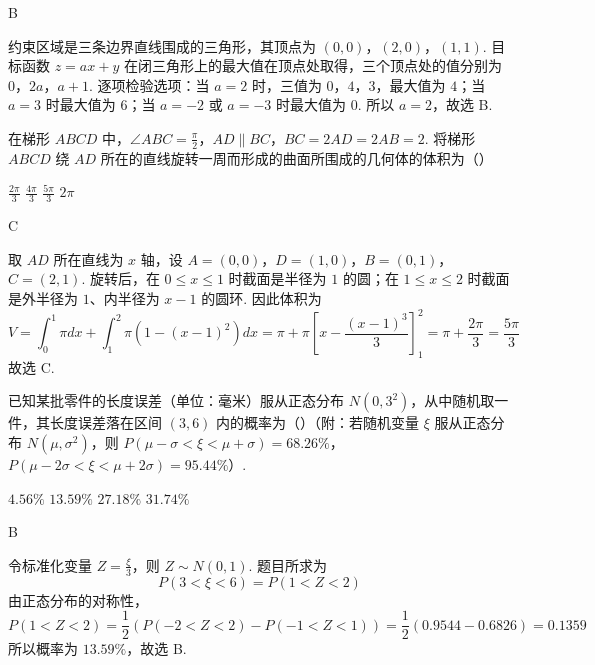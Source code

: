 \begin{answer}
B
\end{answer}

\begin{solution}
约束区域是三条边界直线围成的三角形，其顶点为
\((0,0)\)，\((2,0)\)，\((1,1)\).
目标函数 \(z=ax+y\) 在闭三角形上的最大值在顶点处取得，三个顶点处的值分别为
\(0\)，\(2a\)，\(a+1\).
逐项检验选项：当 \(a=2\) 时，三值为 \(0\)，\(4\)，\(3\)，最大值为 \(4\)；当 \(a=3\) 时最大值为 \(6\)；当 \(a=-2\) 或 \(a=-3\) 时最大值为 \(0\).
所以 \(a=2\)，故选 B.
\end{solution}

\begin{problem}
在梯形 \(ABCD\) 中，\(\angle ABC = \frac{\pi}{2}\)，\(AD \parallel BC\)，\(BC = 2AD = 2AB = 2\). 将梯形 \(ABCD\) 绕 \(AD\) 所在的直线旋转一周而形成的曲面所围成的几何体的体积为（\quad）

\choices
    {\(\frac{2\pi}{3}\)}
    {\(\frac{4\pi}{3}\)}
    {\(\frac{5\pi}{3}\)}
    {\(2\pi\)}
\end{problem}

\begin{answer}
C
\end{answer}

\begin{solution}
取 \(AD\) 所在直线为 \(x\) 轴，设
\(A=(0,0)\)，\(D=(1,0)\)，\(B=(0,1)\)，\(C=(2,1)\).
旋转后，在 \(0\leqslant x\leqslant1\) 时截面是半径为 \(1\) 的圆；在 \(1\leqslant x\leqslant2\) 时截面是外半径为 \(1\)、内半径为 \(x-1\) 的圆环. 因此体积为
\[
V=\int_0^1\pi dx+\int_1^2\pi\left(1-(x-1)^2\right)dx
=\pi+\pi\left[x-\frac{(x-1)^3}{3}\right]_1^2
=\pi+\frac{2\pi}{3}=\frac{5\pi}{3}
\]
故选 C.
\end{solution}

\begin{problem}
已知某批零件的长度误差（单位：毫米）服从正态分布 \(N(0,3^2)\)，从中随机取一件，其长度误差落在区间 \((3,6)\) 内的概率为（\quad）（附：若随机变量 \(\xi\) 服从正态分布 \(N(\mu,\sigma^2)\)，则 \(P(\mu - \sigma < \xi < \mu + \sigma) = 68.26\%\)，\(P(\mu - 2\sigma < \xi < \mu + 2\sigma) = 95.44\%\)）.

\choices
    {\(4.56\%\)}
    {\(13.59\%\)}
    {\(27.18\%\)}
    {\(31.74\%\)}
\end{problem}

\begin{answer}
B
\end{answer}

\begin{solution}
令标准化变量 \(Z=\frac{\xi}{3}\)，则 \(Z\sim N(0,1)\). 题目所求为
\[
P(3<\xi<6)=P(1<Z<2)
\]
由正态分布的对称性，
\[
P(1<Z<2)=\frac12\left(P(-2<Z<2)-P(-1<Z<1)\right)
=\frac12(0.9544-0.6826)=0.1359
\]
所以概率为 \(13.59\%\)，故选 B.
\end{solution}

